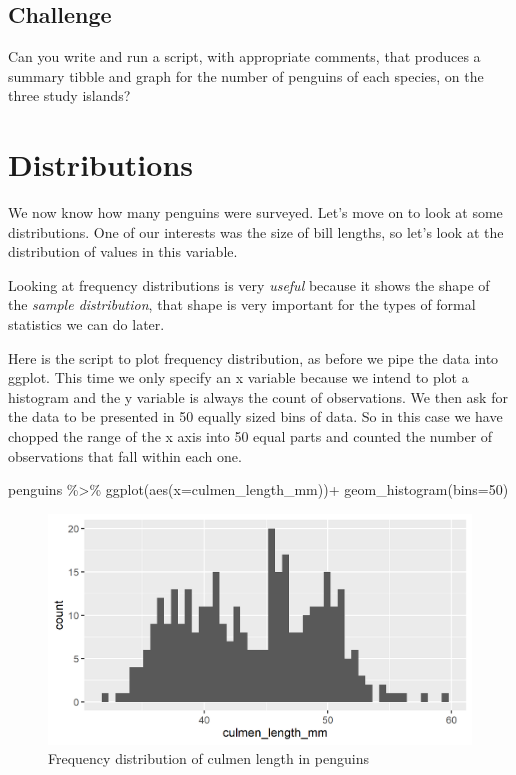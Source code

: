 \documentclass[
]{book}
\makeatletter
\newenvironment{Shaded}{\begin{snugshade}}{\end{snugshade}}
\newcommand{\AttributeTok}[1]{\textcolor[rgb]{0.77,0.63,0.00}{#1}}
\newcommand{\DecValTok}[1]{\textcolor[rgb]{0.00,0.00,0.81}{#1}}
\newcommand{\FunctionTok}[1]{\textcolor[rgb]{0.00,0.00,0.00}{#1}}
\newcommand{\NormalTok}[1]{#1}
\newcommand{\SpecialCharTok}[1]{\textcolor[rgb]{0.00,0.00,0.00}{#1}}
\newenvironment{kframe}{%
\medskip{}
\setlength{\fboxsep}{.8em}
 \def\at@end@of@kframe{}%
 \ifinner\ifhmode%
  \def\at@end@of@kframe{\end{minipage}}%
  \begin{minipage}{\columnwidth}%
 \fi\fi%
 \def\FrameCommand##1{\hskip\@totalleftmargin \hskip-\fboxsep
 \colorbox{shadecolor}{##1}\hskip-\fboxsep
     \hskip-\linewidth \hskip-\@totalleftmargin \hskip\columnwidth}%
 \MakeFramed {\advance\hsize-\width
   \@totalleftmargin\z@ \linewidth\hsize
   \@setminipage}}%
 {\par\unskip\endMakeFramed%
 \at@end@of@kframe}
\newenvironment{block}[1]
  {
  \begin{itemize}
  \renewcommand{\labelitemi}{
    \raisebox{-.7\height}[0pt][0pt]{
      {\setkeys{Gin}{width=3em,keepaspectratio}\texttt{[image: images/\#1]}}
    }
  }
  \setlength{\fboxsep}{1em}
  \begin{kframe}
  \item
  }
  {
  \end{kframe}
  \end{itemize}
  }
\newenvironment{rmdquestion}
  {\begin{block}{question}}
  {\end{block}}
\makeatother
\begin{document}
\hypertarget{challenge}{%
\subsection{Challenge}\label{challenge}}

\begin{rmdquestion}
Can you write and run a script, with appropriate comments, that produces
a summary tibble and graph for the number of penguins of each species,
on the three study islands?
\end{rmdquestion}

\hypertarget{distributions}{%
\section{Distributions}\label{distributions}}

We now know how many penguins were surveyed. Let's move on to look at some distributions. One of our interests was the size of bill lengths, so let's look at the distribution of values in this variable.

Looking at frequency distributions is very \emph{useful} because it shows the shape of the \emph{sample distribution}, that shape is very important for the types of formal statistics we can do later.

Here is the script to plot frequency distribution, as before we pipe the data into ggplot. This time we only specify an x variable because we intend to plot a histogram and the y variable is always the count of observations. We then ask for the data to be presented in 50 equally sized bins of data. So in this case we have chopped the range of the x axis into 50 equal parts and counted the number of observations that fall within each one.

\begin{Shaded}
\begin{Highlighting}[]
\NormalTok{penguins }\SpecialCharTok{\%\textgreater{}\%} 
  \FunctionTok{ggplot}\NormalTok{(}\FunctionTok{aes}\NormalTok{(}\AttributeTok{x=}\NormalTok{culmen\_length\_mm))}\SpecialCharTok{+}
  \FunctionTok{geom\_histogram}\NormalTok{(}\AttributeTok{bins=}\DecValTok{50}\NormalTok{)}
\end{Highlighting}
\end{Shaded}

\begin{figure}
\includegraphics[width=0.8\linewidth]{images/Distribution} \caption{Frequency distribution of culmen length in penguins}\label{fig:unnamed-chunk-85}
\end{figure}
\end{document}
